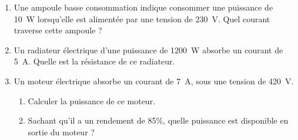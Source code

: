 \documentclass[a4paper,12pt]{article}
\begin{document}
\begin{enumerate}
    \item{} Une ampoule basse consommation indique consommer une puissance de \SI{10}{W} lorsqu'elle est alimentée par une tension de \SI{230}{V}. Quel courant traverse cette ampoule ? 
    \item{} Un radiateur électrique d'une puissance de \SI{1200}{W} absorbe un courant de \SI{5}{A}. Quelle est la résistance de ce radiateur.
    \item{}  Un moteur électrique absorbe un courant de \SI{7}{A}, sous une tension de \SI{420}{V}.
    \begin{enumerate}
        \item Calculer la puissance de ce moteur.
        \item Sachant qu'il a un rendement de 85\%, quelle puissance est disponible en sortie du moteur ? 
    \end{enumerate} 
\end{enumerate}
%
%
%
%
\large\bfseries
%
%
%
%
%
%
%
%
\end{document}
